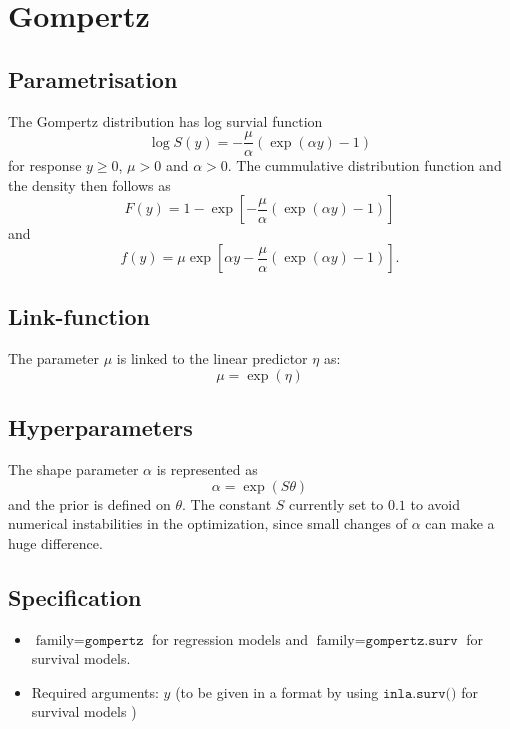 \documentclass[a4paper,11pt]{article}
\begin{document}
\section*{Gompertz}

\subsection*{Parametrisation}

The Gompertz distribution has log survial function
\begin{displaymath}
    \log S(y) = -\frac{\mu}{\alpha}\left(\exp(\alpha y) -1\right)
\end{displaymath}
for response $y\ge 0$, $\mu>0$ and $\alpha>0$. The cummulative
distribution function and the density then follows as
\begin{displaymath}
    F(y) = 1 - \exp\left[ -\frac{\mu}{\alpha}\left(\exp(\alpha y)
        -1\right) \right]
\end{displaymath}
and
\begin{displaymath}
    f(y) = \mu \exp\left[ \alpha y -\frac{\mu}{\alpha}\left(\exp(\alpha y)
        -1\right) \right].
\end{displaymath}

\subsection*{Link-function}
The parameter $\mu$ is linked to the linear predictor $\eta$ as:
\[
    \mu = \exp(\eta)
\]

\subsection*{Hyperparameters}

The shape parameter $\alpha$ is represented as
\begin{displaymath}
    \alpha = \exp(S\theta)
\end{displaymath}
and the prior is defined on $\theta$. The constant $S$ currently set
to $0.1$ to avoid numerical instabilities in the optimization, since
small changes of $\alpha$ can make a huge difference.

\subsection*{Specification}

\begin{itemize}
\item $\text{family}=\texttt{gompertz}$ for regression models and 
 $\text{family}=\texttt{gompertz.surv}$ for survival models.
\item Required arguments: $y$ (to be given in a format by using
    $\texttt{inla.surv()}$ for survival models )
\end{itemize}
\end{document}
